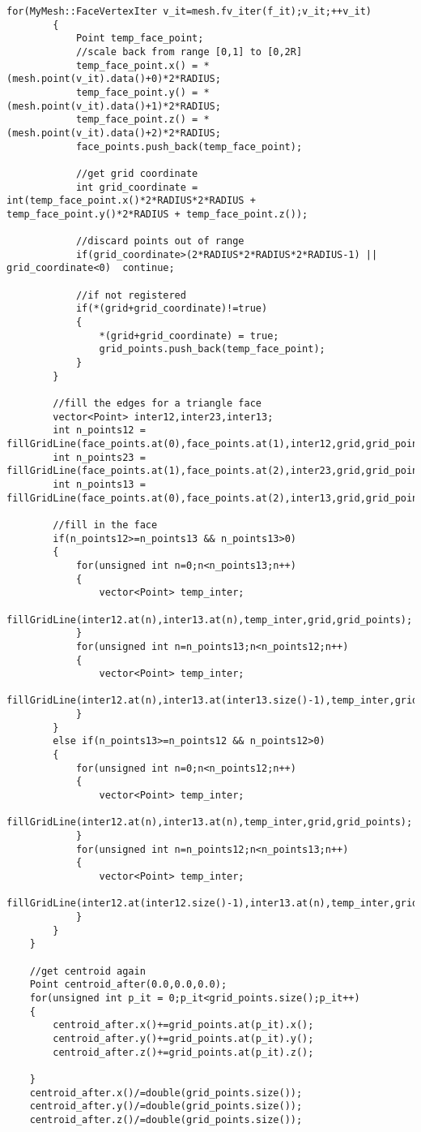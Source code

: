 \begin{enumerate}[1.]
\begin{lstlisting}[xleftmargin=0em]
		for(MyMesh::FaceVertexIter v_it=mesh.fv_iter(f_it);v_it;++v_it)
		{
			Point temp_face_point;
			//scale back from range [0,1] to [0,2R]
			temp_face_point.x() = *(mesh.point(v_it).data()+0)*2*RADIUS;
			temp_face_point.y() = *(mesh.point(v_it).data()+1)*2*RADIUS;
			temp_face_point.z() = *(mesh.point(v_it).data()+2)*2*RADIUS;
			face_points.push_back(temp_face_point);

			//get grid coordinate
			int grid_coordinate	= int(temp_face_point.x()*2*RADIUS*2*RADIUS + temp_face_point.y()*2*RADIUS + temp_face_point.z());

			//discard points out of range
			if(grid_coordinate>(2*RADIUS*2*RADIUS*2*RADIUS-1) || grid_coordinate<0)  continue; 

			//if not registered
			if(*(grid+grid_coordinate)!=true)
			{
				*(grid+grid_coordinate) = true;
				grid_points.push_back(temp_face_point);
			}
		}

		//fill the edges for a triangle face
		vector<Point> inter12,inter23,inter13;
		int n_points12 = fillGridLine(face_points.at(0),face_points.at(1),inter12,grid,grid_points);
		int n_points23 = fillGridLine(face_points.at(1),face_points.at(2),inter23,grid,grid_points);
		int n_points13 = fillGridLine(face_points.at(0),face_points.at(2),inter13,grid,grid_points);

		//fill in the face
		if(n_points12>=n_points13 && n_points13>0)
		{
			for(unsigned int n=0;n<n_points13;n++)
			{
				vector<Point> temp_inter;
				fillGridLine(inter12.at(n),inter13.at(n),temp_inter,grid,grid_points);
			}
			for(unsigned int n=n_points13;n<n_points12;n++)
			{
				vector<Point> temp_inter;
				fillGridLine(inter12.at(n),inter13.at(inter13.size()-1),temp_inter,grid,grid_points);
			}
		} 
		else if(n_points13>=n_points12 && n_points12>0)
		{
			for(unsigned int n=0;n<n_points12;n++)
			{
				vector<Point> temp_inter;
				fillGridLine(inter12.at(n),inter13.at(n),temp_inter,grid,grid_points);
			}
			for(unsigned int n=n_points12;n<n_points13;n++)
			{
				vector<Point> temp_inter;
				fillGridLine(inter12.at(inter12.size()-1),inter13.at(n),temp_inter,grid,grid_points);
			}
		}
	}

	//get centroid again
	Point centroid_after(0.0,0.0,0.0);
	for(unsigned int p_it = 0;p_it<grid_points.size();p_it++)
	{
		centroid_after.x()+=grid_points.at(p_it).x();
		centroid_after.y()+=grid_points.at(p_it).y();
		centroid_after.z()+=grid_points.at(p_it).z();

	}
	centroid_after.x()/=double(grid_points.size());
	centroid_after.y()/=double(grid_points.size());
	centroid_after.z()/=double(grid_points.size());


\end{lstlisting}
\end{enumerate}
